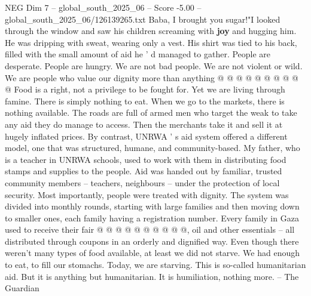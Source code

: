 \begin{textsample}{NEG Dim 7 – global\_south\_2025\_06 – Score -5.00 – global\_south\_2025\_06/126139265.txt}
Baba, I brought you sugar!"I looked through the window and saw his children screaming with \textbf{joy} and hugging him.
He was dripping with sweat, wearing only a vest.
His shirt was tied to his back, filled with the small amount of aid he ' d managed to gather.
People are desperate.
People are hungry.
We are not bad people.
We are not violent or wild.
We are people who value our dignity more than anything @ @ @ @ @ @ @ @ @ @ Food is a right, not a privilege to be fought for.
Yet we are living through famine.
There is simply nothing to eat.
When we go to the markets, there is nothing available.
The roads are full of armed men who target the weak to take any aid they do manage to access.
Then the merchants take it and sell it at hugely inflated prices.
By contrast, UNRWA ' s aid system offered a different model, one that was structured, humane, and community-based.
My father, who is a teacher in UNRWA schools, used to work with them in distributing food stamps and supplies to the people.
Aid was handed out by familiar, trusted community members -- teachers, neighbours -- under the protection of local security.
Most importantly, people were treated with dignity.
The system was divided into monthly rounds, starting with large families and then moving down to smaller ones, each family having a registration number.
Every family in Gaza used to receive their fair @ @ @ @ @ @ @ @ @ @, oil and other essentials -- all distributed through coupons in an orderly and dignified way.
Even though there weren't many types of food available, at least we did not starve.
We had enough to eat, to fill our stomachs.
Today, we are starving.
This is so-called humanitarian aid.
But it is anything but humanitarian.
It is humiliation, nothing more. -- The Guardian

\end{textsample}
